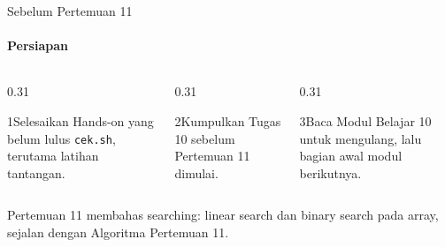 \documentclass[t]{beamer}
\begin{document}
\begin{frame}{Sebelum Pertemuan 11}
\framesubtitle{Persiapan}
\begin{columns}[T]
\begin{column}{0.31\textwidth}
\begin{Langkah}{1}{Selesaikan}
Hands-on yang belum lulus \texttt{cek.sh}, terutama latihan tantangan.
\end{Langkah}
\end{column}
\begin{column}{0.31\textwidth}
\begin{Langkah}{2}{Kumpulkan}
Tugas 10 sebelum Pertemuan 11 dimulai.
\end{Langkah}
\end{column}
\begin{column}{0.31\textwidth}
\begin{Langkah}{3}{Baca}
Modul Belajar 10 untuk mengulang, lalu bagian awal modul berikutnya.
\end{Langkah}
\end{column}
\end{columns}
\vspace{10pt}
Pertemuan 11 membahas searching: linear search dan binary search pada array, sejalan dengan Algoritma Pertemuan 11.
\end{frame}

\end{document}
